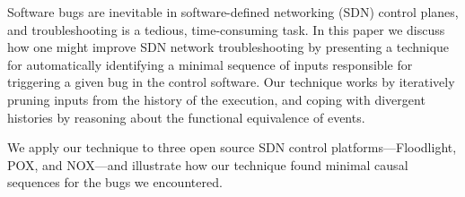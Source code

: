 Software bugs are inevitable in software-defined networking (SDN) control planes,
and troubleshooting
is a tedious, time-consuming task.
In this paper we discuss how one might improve SDN
network troubleshooting by presenting a technique for automatically identifying
a minimal sequence of inputs responsible for triggering a given bug in the
control software.
Our technique works by
iteratively pruning inputs from the history of the execution, and
coping with divergent histories by reasoning about the functional equivalence
of events.

We apply our technique to three open source SDN control
platforms---Floodlight, POX, and NOX---and
illustrate how our technique found minimal causal sequences for
the bugs we encountered.
